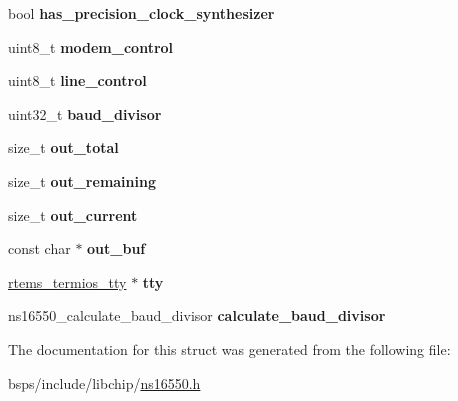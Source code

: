 \begin{DoxyCompactItemize}
\item 
\mbox{\label{structns16550__context_aa6953118281c2d9c0fe84610f0ab68b9}} 
bool {\bfseries has\+\_\+precision\+\_\+clock\+\_\+synthesizer}
\item 
\mbox{\label{structns16550__context_a554e5ef5241c75374565021b98af8c41}} 
uint8\+\_\+t {\bfseries modem\+\_\+control}
\item 
\mbox{\label{structns16550__context_a1d45a05cfebf86342477abc34677118d}} 
uint8\+\_\+t {\bfseries line\+\_\+control}
\item 
\mbox{\label{structns16550__context_a52f04bd716922d6b8bce2503a2b182d2}} 
uint32\+\_\+t {\bfseries baud\+\_\+divisor}
\item 
\mbox{\label{structns16550__context_af4e4e54e01e9791d44dd7fbf7a474921}} 
size\+\_\+t {\bfseries out\+\_\+total}
\item 
\mbox{\label{structns16550__context_ae6193418e8e3e50d01c628e5095c0e05}} 
size\+\_\+t {\bfseries out\+\_\+remaining}
\item 
\mbox{\label{structns16550__context_aa562b4fc653f551b1a859f3b4378d24c}} 
size\+\_\+t {\bfseries out\+\_\+current}
\item 
\mbox{\label{structns16550__context_aa0fb4b5362a4e8f2777a4549eaf821b8}} 
const char $\ast$ {\bfseries out\+\_\+buf}
\item 
\mbox{\label{structns16550__context_abc9d9d852179a7b1f5a6c763b2694573}} 
\mbox{\hyperlink{structrtems__termios__tty}{rtems\+\_\+termios\+\_\+tty}} $\ast$ {\bfseries tty}
\item 
\mbox{\label{structns16550__context_a38df8ffe294324873f0710a324e70575}} 
ns16550\+\_\+calculate\+\_\+baud\+\_\+divisor {\bfseries calculate\+\_\+baud\+\_\+divisor}
\end{DoxyCompactItemize}


The documentation for this struct was generated from the following file\+:\begin{DoxyCompactItemize}
\item 
bsps/include/libchip/\mbox{\hyperlink{ns16550_8h}{ns16550.\+h}}\end{DoxyCompactItemize}
